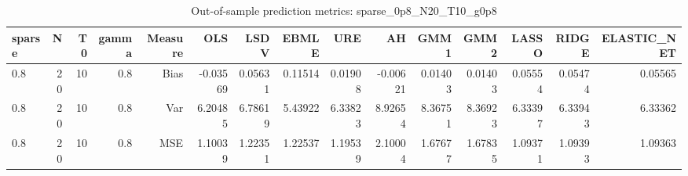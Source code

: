 \begin{table}[!htbp]\centering
\caption{Out-of-sample prediction metrics: sparse_0p8_N20_T10_g0p8}
\label{tab:table3_sparse_0p8_N20_T10_g0p8}
\begin{tabular}{lrrrrrrrrrrrrrr}
\hline
sparse & N & T0 & gamma & Measure & OLS & LSDV & EBMLE & URE & AH & GMM1 & GMM2 & LASSO & RIDGE & ELASTIC_NET \\
\hline
0.8 & 20 & 10 & 0.8 & Bias & -0.03569 & 0.05631 & 0.11514 & 0.01908 & -0.00621 & 0.01403 & 0.01403 & 0.05554 & 0.05474 & 0.05565 \\
0.8 & 20 & 10 & 0.8 & Var & 6.20485 & 6.78619 & 5.43922 & 6.33823 & 8.92654 & 8.36751 & 8.36923 & 6.33397 & 6.33943 & 6.33362 \\
0.8 & 20 & 10 & 0.8 & MSE & 1.10039 & 1.22351 & 1.22537 & 1.19539 & 2.10004 & 1.67677 & 1.67835 & 1.09371 & 1.09393 & 1.09363 \\
\hline
\end{tabular}
\end{table}

